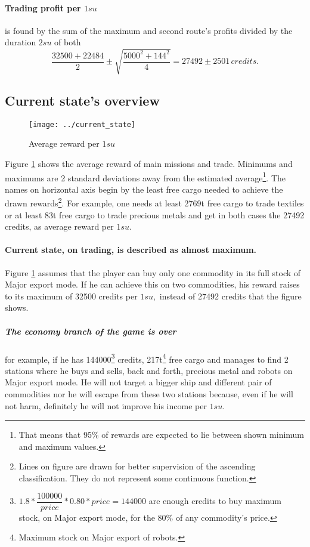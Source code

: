 \documentclass[]{article}
\begin{document}
\paragraph{Trading profit per $1su$} is found by the sum of the maximum and second route's profits divided by the duration $2su$ of both
\begin{equation}\label{eq:trade_profit}
	\dfrac{32500+22484}{2}\pm \sqrt{\dfrac{5000^2+144^2}{4}}=27492\pm2501\,credits.
\end{equation}
\subsection{Current state's overview}
\begin{figure}[h]
	\centering
	\texttt{[image: ../current\_state]}
	\caption{Average reward per $1su$}
	\label{fig:currentstate}
\end{figure}
Figure \ref{fig:currentstate} shows the average reward of main missions and trade. Minimums and maximums are 2 standard deviations away from the estimated average\footnote{That means that 95\% of rewards are expected to lie  between shown minimum and maximum values.}. The names on horizontal axis begin by the least free cargo needed to achieve the drawn rewards\footnote{Lines on figure are drawn for better supervision of the ascending classification. They do not represent some continuous function.}. For example, one needs at least 2769t free cargo to trade textiles or at least 83t free cargo to trade precious metals and get in both cases the 27492 credits, as average reward per $1su.$
\paragraph{Current state, on trading, is described as almost maximum.} Figure \ref{fig:currentstate} assumes that the player can buy only one commodity in its full stock of Major export mode. If he can achieve this on two commodities, his reward raises to its maximum of 32500 credits per $1su,$ instead of 27492 credits that the figure shows.
\subparagraph*{The economy branch of the game is over} for example, if he has 144000\footnote{$1.8*\dfrac{100000}{price}*0.80*price=144000$ are enough credits to buy maximum stock, on Major export mode, for the 80\% of any commodity's price.} credits, 217t\footnote{Maximum stock on Major export of robots.} free cargo and manages to find 2 stations where he buys and sells, back and forth, precious metal and robots on Major export mode. He will not target a bigger ship and different pair of commodities nor he will escape from these two stations because, even if he will not harm, definitely he will not improve his income per $1su.$  
\end{document}
